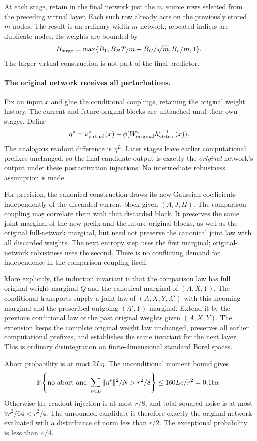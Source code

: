 At each stage, retain in the final network just the $m$ source rows selected
from the preceding virtual layer. Each such row already acts on the previously
stored $m$ nodes. The result is an ordinary width-$m$ network; repeated indices
are duplicate nodes. Its weights are bounded by
\[
 B_{\rm large}=\max\{B_1,B_HT/m+B_G/\sqrt m,B_v/m,1\}.
\]
The larger virtual construction is not part of the final predictor.

\paragraph{The original network receives all perturbations.}
Fix an input $x$ and glue the conditional couplings, retaining the original
weight history. The current and future original blocks are untouched until
their own stages. Define
\[
 \eta^s=h^s_{\rm virtual}(x)
           -\phi(W^s_{\rm original}h^{s-1}_{\rm virtual}(x)).
\]
The analogous readout difference is $\eta^L$. Later stages leave earlier
computational prefixes unchanged, so the final candidate output is exactly
the \emph{original} network's output under these postactivation injections.
No intermediate robustness assumption is made.

For precision, the canonical construction draws its new Gaussian coefficients
independently of the discarded current block given $(A,J,H)$. The comparison
coupling may correlate them with that discarded block. It preserves the same
joint marginal of the new prefix and the future original blocks, as well as
the original full-network marginal, but need not preserve the canonical joint
law with all discarded weights. The next entropy step uses the first marginal;
original-network robustness uses the second. There is no conflicting demand
for independence in the comparison coupling itself.

More explicitly, the induction invariant is that the comparison law has
full original-weight marginal $Q$ and the canonical marginal of
$(A,X,Y)$. The conditional transports supply a joint law of
$(A,X,Y,A')$ with this incoming marginal and the prescribed outgoing
$(A',Y)$ marginal. Extend it by the previous conditional law of the past
original weights given $(A,X,Y)$. The extension keeps the complete original
weight law unchanged, preserves all earlier computational prefixes, and
establishes the same invariant for the next layer. This is ordinary
disintegration on finite-dimensional standard Borel spaces.

Abort probability is at most $2L\eta$. The unconditional moment bound gives
\[
 \mathbb P\left\{\text{no abort and }\sum_{s<L}\|\eta^s\|^2/N>r^2/8\right\}
 \le160Le/r^2=0.16\alpha.
\]
Otherwise the readout injection is at most $r/8$, and total squared noise is
at most $9r^2/64<r^2/4$. The unrounded candidate is therefore exactly the
original network evaluated with a disturbance of norm less than $r/2$.
The exceptional probability is less than $\alpha/4$.

